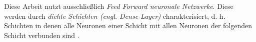 \newpage
Diese Arbeit nutzt ausschließlich \textit{Feed Forward neuronale Netzwerke}.
Diese werden durch \textit{dichte Schichten (engl. Dense-Layer)} charakterisiert, d. h. Schichten in denen alle Neuronen
einer Schicht mit allen Neuronen der folgenden Schicht verbunden sind \cite{bengio2017deep}.





